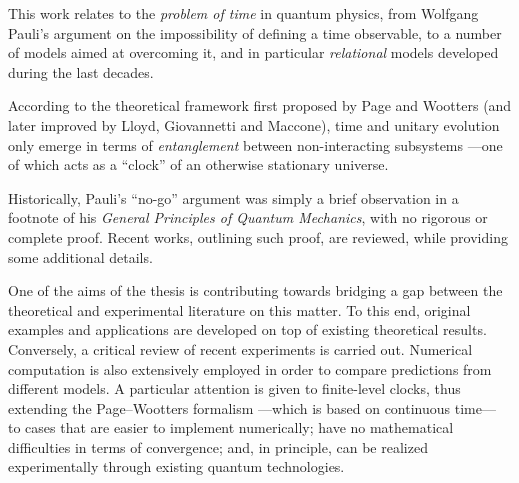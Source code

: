This work relates to the \emph{problem of time} in quantum physics,
from Wolfgang Pauli's argument
on the impossibility of defining a time observable, %
to a number of models aimed at overcoming it,
and in particular \emph{relational} models
developed during the last decades.

According to the theoretical framework first proposed by Page and Wootters
(and later improved by Lloyd, Giovannetti and Maccone),
time and unitary evolution only emerge in
terms of \emph{entanglement} between non-interacting subsystems
---one of which acts as a ``clock''
of an otherwise stationary universe. %

Historically, Pauli's ``no-go'' argument was simply a brief observation in a footnote
of his \textit{General Principles of Quantum Mechanics},
with no rigorous or complete proof. Recent works, outlining such proof, are
reviewed, while providing some additional details.

One of the aims of the thesis
is contributing towards bridging a gap between the theoretical
and experimental literature on this matter.
To this end, original examples and applications are developed on top of existing theoretical results.
Conversely,
a critical review
of recent experiments is carried out.
Numerical computation is also extensively employed in order to compare
predictions from different models. A particular attention is given
to finite-level clocks,
thus extending the Page--Wootters formalism ---which is based on continuous time---
to cases that are easier to implement numerically;
have no mathematical difficulties in terms of convergence;
and, in principle, can be realized experimentally through existing quantum technologies.